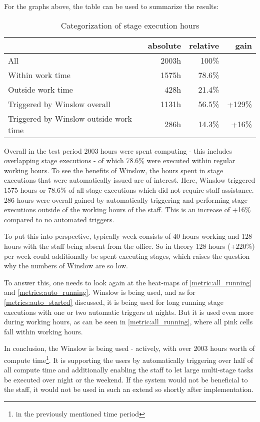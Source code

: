 For the graphs above, the table can be used to summarize the results:

\begin{table}
	\centering
	\begin{tabular}{l|r|r|r}
												& absolute 			& relative	& gain \\
		\hline
		All 		 							& 2003h 			& 100\% 	& \\
		Within work time						& 1575h				& 78.6\% 	& \\
		Outside work time	 					&  428h 			& 21.4\% 	& \\
		Triggered by Winslow overall			& 1131h				& 56.5\%	& +129\%\\
		Triggered by Winslow outside work time	&  286h  			& 14.3\% 	& +16\%\\
		 
	\end{tabular}
	\caption{Categorization of stage execution hours}
\end{table}

Overall in the test period 2003 hours were spent computing - this includes overlapping stage executions - of which 78.6\% were executed within regular working hours.
To see the benefits of Winslow, the hours spent in stage executions that were automatically issued are of interest.
Here, Winslow triggered 1575 hours or 78.6\% of all stage executions which did not require staff assistance.
286 hours were overall gained by automatically triggering and performing stage executions outside of the working hours of the staff.
This is an increase of +16\% compared to no automated triggers.

To put this into perspective, typically week consists of 40 hours working and 128 hours with the staff being absent from the office.
So in theory 128 hours (+220\%) per week could additionally be spent executing stages, which raises the question why the numbers of Winslow are so low.

To answer this, one needs to look again at the heat-maps of \autoref{metric:all_running} and \autoref{metrics:auto_running}.
Winslow is being used, and as for \autoref{metrics:auto_started} discussed, it is being used for long running stage executions with one or two automatic triggers at nights.
But it is used even more during working hours, as can be seen in \autoref{metric:all_running}, where all pink cells fall within working hours.

In conclusion, the Winslow is being used - actively, with over 2003 hours worth of compute time\footnote{in the previously mentioned time period}.
It is supporting the users by automatically triggering over half of all compute time and additionally enabling the staff to let large multi-stage tasks be executed over night or the weekend.
If the system would not be beneficial to the staff, it would not be used in such an extend so shortly after implementation.

